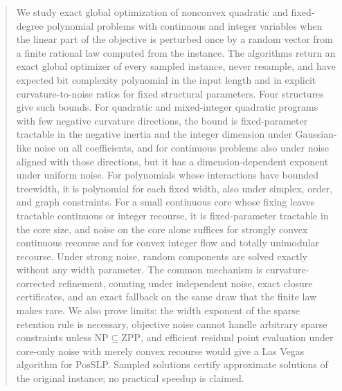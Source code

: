 \begin{abstract}
We study exact global optimization of nonconvex quadratic and fixed-degree
polynomial problems with continuous and integer variables when the linear
part of the objective is perturbed once by a random vector from a finite
rational law computed from the instance. The algorithms return an exact
global optimizer of every sampled instance, never resample, and have
expected bit complexity polynomial in the input length and in explicit
curvature-to-noise ratios for fixed structural parameters. Four structures
give such bounds. For quadratic and mixed-integer quadratic programs with few
negative curvature directions, the bound is fixed-parameter tractable in the
negative inertia and the integer dimension under Gaussian-like noise on all
coefficients, and for continuous problems also under noise aligned with
those directions, but it has a dimension-dependent exponent under uniform
noise. For polynomials whose interactions have bounded treewidth, it
is polynomial for each fixed width, also under simplex, order, and graph
constraints. For a small continuous core whose fixing leaves tractable
continuous or integer recourse, it is fixed-parameter tractable in the core
size, and noise on the core alone suffices for strongly convex continuous
recourse and for convex integer flow and totally unimodular recourse. Under
strong noise, random components are solved exactly without any width
parameter. The common mechanism is curvature-corrected refinement, counting
under independent noise, exact closure certificates, and an exact fallback
on the same draw that the finite law makes rare. We also prove limits: the
width exponent of the sparse retention rule is necessary, objective noise
cannot handle arbitrary sparse constraints unless
$\mathrm{NP}\subseteq\mathrm{ZPP}$, and efficient residual point evaluation
under core-only noise with merely convex recourse would give a Las Vegas
algorithm for PosSLP. Sampled solutions certify approximate solutions of the
original instance; no practical speedup is claimed.
\end{abstract}
